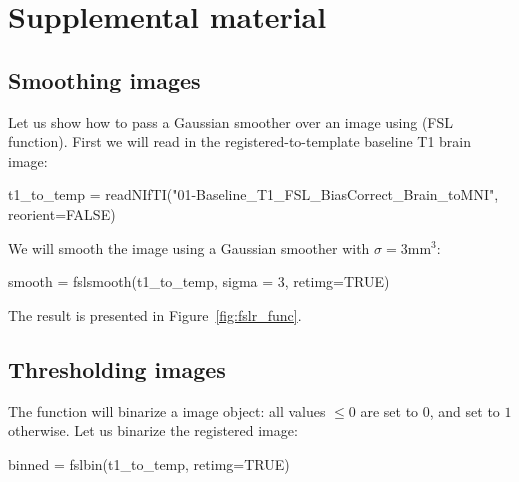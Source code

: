 

\section{Supplemental material}


\subsection{Smoothing images}
Let us show how to pass a Gaussian smoother over an image using  (FSL  function).  First we will read in the registered-to-template baseline T1 brain image:

\gobblepars
\begin{Schunk}
\begin{Sinput}
t1_to_temp = readNIfTI("01-Baseline_T1_FSL_BiasCorrect_Brain_toMNI", reorient=FALSE)
\end{Sinput}
\end{Schunk}

We will smooth the image using a Gaussian smoother with $\sigma = 3\text{mm}^3$: 

\gobblepars
\begin{Schunk}
\begin{Sinput}
smooth = fslsmooth(t1_to_temp, sigma = 3, retimg=TRUE)
\end{Sinput}
\end{Schunk}

The result is presented in Figure~\ref{fig:fslr_func}\protect{}.


\subsection{Thresholding images}
The   function will binarize a  image object: all values $\leq 0$ are set to $0$, and set to $1$ otherwise.  Let us binarize the registered image:


\gobblepars
\begin{Schunk}
\begin{Sinput}
binned = fslbin(t1_to_temp, retimg=TRUE)
\end{Sinput}
\end{Schunk}

